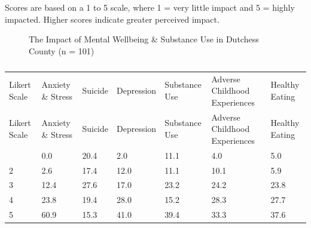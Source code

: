 \documentclass[
  english,
  letterpaper,
]{report}
\begin{document}
\begin{tcolorbox}[enhanced jigsaw, breakable, leftrule=.75mm, title=\textcolor{quarto-callout-note-color}{\faInfo}\hspace{0.5em}{Note}, bottomrule=.15mm, opacityback=0, left=2mm, colback=white, bottomtitle=1mm, coltitle=black, colbacktitle=quarto-callout-note-color!10!white, colframe=quarto-callout-note-color-frame, opacitybacktitle=0.6, toptitle=1mm, titlerule=0mm, arc=.35mm, rightrule=.15mm, toprule=.15mm]

Scores are based on a 1 to 5 scale, where 1 = very little impact and 5 =
highly impacted. Higher scores indicate greater perceived impact.

\end{tcolorbox}

\begin{figure}


\caption{\label{fig-dc-impact-mhsu}The Impact of Mental Wellbeing \&
Substance Use in Dutchess County (n = 101)}

\end{figure}%

\begin{longtable}[]{@{}lllllll@{}}

\caption{\label{tbl-dc-impact-mhsu}The Impact of Mental Wellbeing \&
Substance Use in Dutchess County (n = 101)}

\tabularnewline

\caption{}\label{T_f5b8a}\tabularnewline
\toprule\noalign{}
Likert Scale & Anxiety \& Stress & Suicide & Depression & Substance Use
& Adverse Childhood Experiences & Healthy Eating \\
\midrule\noalign{}
\endfirsthead
\toprule\noalign{}
Likert Scale & Anxiety \& Stress & Suicide & Depression & Substance Use
& Adverse Childhood Experiences & Healthy Eating \\
\midrule\noalign{}
\endhead
\bottomrule\noalign{}
\endlastfoot
1 & 0.0 & 20.4 & 2.0 & 11.1 & 4.0 & 5.0 \\
2 & 2.6 & 17.4 & 12.0 & 11.1 & 10.1 & 5.9 \\
3 & 12.4 & 27.6 & 17.0 & 23.2 & 24.2 & 23.8 \\
4 & 23.8 & 19.4 & 28.0 & 15.2 & 28.3 & 27.7 \\
5 & 60.9 & 15.3 & 41.0 & 39.4 & 33.3 & 37.6 \\

\end{longtable}
\end{document}
